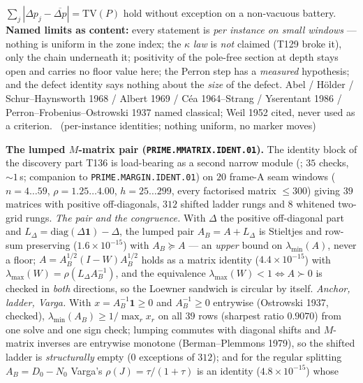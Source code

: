 $\sum_j|\Delta p_j-\overline{\Delta p}|=\mathrm{TV}(P)$ hold without exception on
a non-vacuous battery.
\textbf{Named limits as content:} every statement is \emph{per instance on small
windows} --- nothing is uniform in the zone index; the $\kappa$ \emph{law} is
\emph{not} claimed (T129 broke it), only the chain underneath it; positivity of
the pole-free section at depth stays open and carries no floor value here; the
Perron step has a \emph{measured} hypothesis; and the defect identity says
nothing about the \emph{size} of the defect.
Abel / H\"older / Schur--Haynsworth 1968 / Albert 1969 / C\'ea 1964--Strang /
Yserentant 1986 / Perron--Frobenius--Ostrowski 1937 named classical; Weil 1952
cited, never used as a criterion.
\mE\ (per-instance identities; nothing uniform, no marker moves)


\par\smallskip\noindent\textbf{The lumped $M$-matrix pair
(\texttt{PRIME.MMATRIX.IDENT.01}).}
The identity block of the discovery part T136 is load-bearing as a second narrow
module (; $35$ checks, ${\sim}1$\,s;
companion to \texttt{PRIME.MARGIN.IDENT.01}) on $20$ frame-A seam windows
($n=4\ldots59$, $\rho=1.25\ldots4.00$, $h=25\ldots299$, every factorised matrix
$\le300$) giving $39$ matrices with positive off-diagonals, $312$ shifted ladder
rungs and $8$ whitened two-grid rungs.
\emph{The pair and the congruence.} With $\Delta$ the positive off-diagonal part
and $L_\Delta=\mathrm{diag}(\Delta\mathbf 1)-\Delta$, the lumped pair
$A_B=A+L_\Delta$ is Stieltjes and row-sum preserving ($1.6\times10^{-15}$) with
$A_B\succeq A$ --- an \emph{upper} bound on $\lambda_{\min}(A)$, never a floor;
$A=A_B^{1/2}(I-W)A_B^{1/2}$ holds as a matrix identity ($4.4\times10^{-15}$) with
$\lambda_{\max}(W)=\rho(L_\Delta A_B^{-1})$, and the equivalence
$\lambda_{\max}(W)<1\iff A\succ0$ is checked in \emph{both} directions, so the
Loewner sandwich is circular by itself.
\emph{Anchor, ladder, Varga.} With $x=A_B^{-1}\mathbf 1\ge0$ and $A_B^{-1}\ge0$
entrywise (Ostrowski 1937, checked), $\lambda_{\min}(A_B)\ge1/\max_r x_r$ on all
$39$ rows (sharpest ratio $0.9070$) from one solve and one sign check; lumping
commutes with diagonal shifts and $M$-matrix inverses are entrywise monotone
(Berman--Plemmons 1979), so the shifted ladder is \emph{structurally} empty
($0$ exceptions of $312$); and for the regular splitting $A_B=D_0-N_0$ Varga's
$\rho(J)=\tau/(1+\tau)$ is an identity ($4.8\times10^{-15}$) whose
